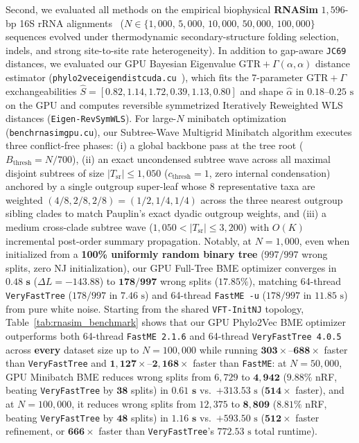 \documentclass[11pt,a4paper]{article}
\makeatletter
\DeclareRobustCommand{\_}{\ifmmode\nfss@text{\textunderscore}\else\textunderscore\allowbreak\fi}
\theoremstyle{definition}
\makeatother
\begin{document}
Second, we evaluated all methods on the empirical biophysical \textbf{RNASim} $1{,}596$-bp 16S rRNA alignments~\cite{mirarab2015pasta} ($N \in \{1{,}000, \, 5{,}000, \, 10{,}000, \, 50{,}000, \, 100{,}000\}$ sequences evolved under thermodynamic secondary-structure folding selection, indels, and strong site-to-site rate heterogeneity). In addition to gap-aware \texttt{JC69} distances, we evaluated our GPU Bayesian Eigenvalue $\text{GTR}+\Gamma(\alpha,\alpha)$ distance estimator (\texttt{phylo2vec\_eigen\_dist\_cuda.cu}~\cite{penn2025eigen}), which fits the 7-parameter $\text{GTR}+\Gamma$ exchangeabilities $\hat{S} = [0.82, 1.14, 1.72, 0.39, 1.13, 0.80]$ and shape $\hat{\alpha}$ in $0.18\text{--}0.25\text{ s}$ on the GPU and computes reversible symmetrized Iteratively Reweighted WLS distances (\texttt{Eigen-RevSymWLS}). For large-$N$ minibatch optimization (\texttt{bench\_rnasim\_gpu.cu}), our Subtree-Wave Multigrid Minibatch algorithm executes three conflict-free phases: (i) a global backbone pass at the tree root ($B_{\text{thresh}} = N/700$), (ii) an exact uncondensed subtree wave across all maximal disjoint subtrees of size $|T_{\text{sr}}| \le 1{,}050$ ($c_{\text{thresh}} = 1$, zero internal condensation) anchored by a single outgroup super-leaf whose 8 representative taxa are weighted $(4/8, 2/8, 2/8) = (1/2, 1/4, 1/4)$ across the three nearest outgroup sibling clades to match Pauplin's exact dyadic outgroup weights, and (iii) a medium cross-clade subtree wave ($1{,}050 < |T_{\text{sr}}| \le 3{,}200$) with $O(K)$ incremental post-order summary propagation. Notably, at $N = 1{,}000$, even when initialized from a \textbf{100\% uniformly random binary tree} ($997/997$ wrong splits, zero NJ initialization), our GPU Full-Tree BME optimizer converges in $\mathbf{0.48\text{ s}}$ ($\Delta L = -143.88$) to $\mathbf{178/997}$ wrong splits ($17.85\%$), matching 64-thread \texttt{VeryFastTree} ($178/997$ in $7.46\text{ s}$) and 64-thread \texttt{FastME -u} ($178/997$ in $11.85\text{ s}$) from pure white noise. Starting from the shared \texttt{VFT-InitNJ} topology, Table~\ref{tab:rnasim_benchmark} shows that our GPU Phylo2Vec BME optimizer outperforms both 64-thread \texttt{FastME 2.1.6} and 64-thread \texttt{VeryFastTree 4.0.5} across \textbf{every} dataset size up to $N = 100{,}000$ while running $\mathbf{303\times\text{--}688\times}$ faster than \texttt{VeryFastTree} and $\mathbf{1{,}127\times\text{--}2{,}168\times}$ faster than \texttt{FastME}: at $N = 50{,}000$, GPU Minibatch BME reduces wrong splits from $6{,}729$ to $\mathbf{4{,}942}$ ($\mathbf{9.88\%}$ nRF, beating \texttt{VeryFastTree} by $\mathbf{38}$ splits) in $\mathbf{0.61\text{ s}}$ vs.\ $+313.53\text{ s}$ ($\mathbf{514\times}$ faster), and at $N = 100{,}000$, it reduces wrong splits from $12{,}375$ to $\mathbf{8{,}809}$ ($\mathbf{8.81\%}$ nRF, beating \texttt{VeryFastTree} by $\mathbf{48}$ splits) in $\mathbf{1.16\text{ s}}$ vs.\ $+593.50\text{ s}$ ($\mathbf{512\times}$ faster refinement, or $\mathbf{666\times}$ faster than \texttt{VeryFastTree}'s $772.53\text{ s}$ total runtime).
\end{document}
